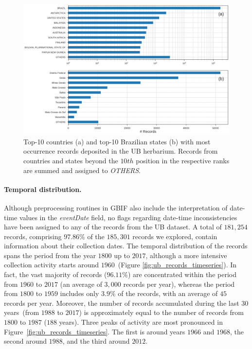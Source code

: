 \begin{figure}[!htb]
\centering
\includegraphics[width=\linewidth]{figures/recs_by_cntry_state.png}
\caption[Top-10 countries and Brazilian states with most occurrence records deposited in the UB herbarium]{Top-10 countries (a) and top-10 Brazilian states (b) with most occurrence records deposited in the UB herbarium. Records from countries and states beyond the $10th$ position in the respective ranks are summed and assigned to \textit{OTHERS}.}
\label{fig:recsbycntrystate}
\end{figure}


\paragraph*{Temporal distribution.}

Although preprocessing routines in GBIF also include the interpretation of date-time values in the \textit{eventDate} field, no flags regarding date-time inconsistencies have been assigned to any of the records from the UB dataset.
A total of $181,254$ records, comprising $97.86\%$ of the $185,301$ records we explored, contain information about their collection dates.
The temporal distribution of the records spans the period from the year $1800$ up to $2017$, although a more intensive collection activity starts around $1960$~(Figure \ref{fig:ub_records_timeseries}).
In fact, the vast majority of records ($96.11\%$) are concentrated within the period from $1960$ to $2017$ (an average of $3,000$ records per year), whereas the period from $1800$ to $1959$ includes only $3.9\%$ of the records, with an average of $45$ records per year.
Moreover, the number of records accumulated during the last $30$ years~(from $1988$ to $2017$) is approximately equal to the number of records from $1800$ to $1987$ ($188$ years). 
Three peaks of activity are most pronounced in Figure~\ref{fig:ub_records_timeseries}.
The first is around years $1966$ and $1968$, the second around $1988$, and the third around $2012$.


